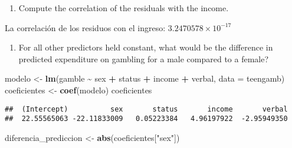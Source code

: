 \documentclass[
]{article}
\newenvironment{Shaded}{\begin{snugshade}}{\end{snugshade}}
\newcommand{\AttributeTok}[1]{\textcolor[rgb]{0.13,0.29,0.53}{#1}}
\newcommand{\FunctionTok}[1]{\textcolor[rgb]{0.13,0.29,0.53}{\textbf{#1}}}
\newcommand{\NormalTok}[1]{#1}
\newcommand{\OtherTok}[1]{\textcolor[rgb]{0.56,0.35,0.01}{#1}}
\newcommand{\SpecialCharTok}[1]{\textcolor[rgb]{0.81,0.36,0.00}{\textbf{#1}}}
\newcommand{\StringTok}[1]{\textcolor[rgb]{0.31,0.60,0.02}{#1}}
\providecommand{\tightlist}{%
  \setlength{\itemsep}{0pt}\setlength{\parskip}{0pt}}
\begin{document}
\begin{enumerate}
\def\labelenumi{(\alph{enumi})}
\setcounter{enumi}{4}
\tightlist
\item
  Compute the correlation of the residuals with the income.
\end{enumerate}

\begin{Shaded}
\end{Shaded}

La correlación de los residuos con el ingreso:
\ensuremath{3.2470578\times 10^{-17}}

\begin{enumerate}
\def\labelenumi{(\alph{enumi})}
\setcounter{enumi}{5}
\tightlist
\item
  For all other predictors held constant, what would be the difference
  in predicted expenditure on gambling for a male compared to a female?
\end{enumerate}

\begin{Shaded}
\begin{Highlighting}[]
\NormalTok{modelo }\OtherTok{\textless{}{-}} \FunctionTok{lm}\NormalTok{(gamble }\SpecialCharTok{\textasciitilde{}}\NormalTok{ sex }\SpecialCharTok{+}\NormalTok{ status }\SpecialCharTok{+}\NormalTok{ income }\SpecialCharTok{+}\NormalTok{ verbal, }\AttributeTok{data =}\NormalTok{ teengamb)}
\NormalTok{coeficientes }\OtherTok{\textless{}{-}} \FunctionTok{coef}\NormalTok{(modelo)}
\NormalTok{coeficientes}
\end{Highlighting}
\end{Shaded}

\begin{verbatim}
##  (Intercept)          sex       status       income       verbal 
##  22.55565063 -22.11833009   0.05223384   4.96197922  -2.95949350
\end{verbatim}

\begin{Shaded}
\begin{Highlighting}[]
\NormalTok{diferencia\_prediccion }\OtherTok{\textless{}{-}} \FunctionTok{abs}\NormalTok{(coeficientes[}\StringTok{"sex"}\NormalTok{])}
\end{Highlighting}
\end{Shaded}
\end{document}
